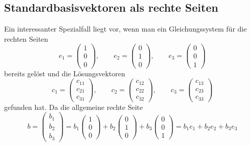 %
%
\subsection{Standardbasisvektoren als rechte Seiten%
\label{skript:subsection:standardrs}}
Ein interessanter Spezialfall liegt vor, wenn man ein Gleichungssystem
für die rechten Seiten 
\[
e_1=\begin{pmatrix}1\\0\\0\end{pmatrix},\qquad
e_2=\begin{pmatrix}0\\1\\0\end{pmatrix},\qquad
e_3=\begin{pmatrix}0\\0\\1\end{pmatrix}
\]
bereits gelöst und die Lösungsvektoren
\[
c_1=\begin{pmatrix} c_{11}\\ c_{21}\\ c_{31} \end{pmatrix},\qquad
c_2=\begin{pmatrix} c_{12}\\ c_{22}\\ c_{32} \end{pmatrix},\qquad
c_3=\begin{pmatrix} c_{13}\\ c_{23}\\ c_{33} \end{pmatrix}
\]
gefunden hat.
Da die allgemeine rechte Seite
\[
b=\begin{pmatrix}
b_1\\b_2\\b_3
\end{pmatrix}
=
b_1 \begin{pmatrix}1\\0\\0\end{pmatrix}
+
b_2 \begin{pmatrix}0\\1\\0\end{pmatrix}
+
b_3 \begin{pmatrix}0\\0\\1\end{pmatrix}
=
b_1 e_1 + b_2 e_2 + b_3 e_3
\]
